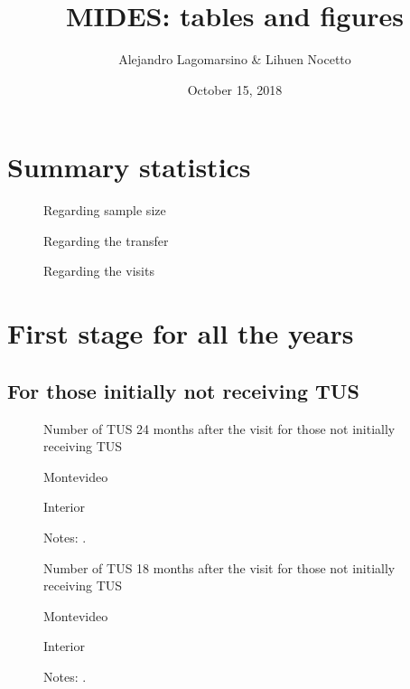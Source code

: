 \documentclass[12pt]{article}
\title{MIDES: tables and figures}
\author{Alejandro Lagomarsino \& Lihuen Nocetto}
\date{October 15, 2018}
\begin{document}
\maketitle	

\section{Summary statistics}
\begin{figure}[H]
\caption{Regarding sample size}

\centering
\label{fig:summStats1}
\end{figure}

\begin{figure}[H]
	\caption{Regarding the transfer}
	
	\centering
	\label{fig:summStats2}
\end{figure}

\begin{figure}[H]
	\caption{Regarding the visits}
	
	\centering
	\label{fig:summStats3}
\end{figure}

\section{First stage for all the years}

\subsection{For those initially not receiving TUS}

\begin{figure}[H]%
	\caption{Number of TUS 24 months after the visit for those not initially receiving TUS}%
	\centering
	\caption*{ {Montevideo}}
	\qquad
	\caption*{Interior}
	\label{fig:first_stage_noTus_tus24}%
	\caption*{ {\footnotesize Notes: .}}
\end{figure}

\begin{figure}[H]%
	\caption{Number of TUS 18 months after the visit for those not initially receiving TUS}%
	\centering
	\caption*{ {Montevideo}}
	\qquad
	\caption*{Interior}
	\label{fig:first_stage_noTus_tus18}%
	\caption*{ {\footnotesize Notes: .}}
\end{figure}
\end{document}
